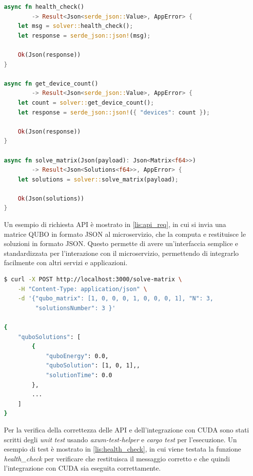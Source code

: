\vspace{5mm}
\begin{lstlisting}[language=Rust, caption=Web API, label=lis:api]
async fn health_check()
        -> Result<Json<serde_json::Value>, AppError> {
    let msg = solver::health_check();
    let response = serde_json::json!(msg);

    Ok(Json(response))
}

async fn get_device_count()
        -> Result<Json<serde_json::Value>, AppError> {
    let count = solver::get_device_count();
    let response = serde_json::json!({ "devices": count });

    Ok(Json(response))
}

async fn solve_matrix(Json(payload): Json<Matrix<f64>>)
        -> Result<Json<Solutions<f64>>, AppError> {
    let solutions = solver::solve_matrix(payload);

    Ok(Json(solutions))
}
\end{lstlisting}
\vspace{5mm}

Un esempio di richiesta \gls{API} è mostrato in \ref{lis:api_req}, in cui si invia una matrice \gls{QUBO} in formato \gls{JSON} al microservizio, che la computa e restituisce le soluzioni in formato \gls{JSON}. Questo permette di avere un'interfaccia semplice e standardizzata per l'interazione con il microservizio, permettendo di integrarlo facilmente con altri servizi e applicazioni.

\newpage
\vspace{5mm}
\begin{lstlisting}[language=bash, caption=Esempio richiesta API, label=lis:api_req]
$ curl -X POST http://localhost:3000/solve-matrix \
    -H "Content-Type: application/json" \
    -d '{"qubo_matrix": [1, 0, 0, 0, 1, 0, 0, 0, 1], "N": 3,
         "solutionsNumber": 3 }'

{
    "quboSolutions": [
        {
            "quboEnergy": 0.0,
            "quboSolution": [1, 0, 1],,
            "solutionTime": 0.0
        },
        ...
    ]
}
\end{lstlisting}
\vspace{5mm}

Per la verifica della correttezza delle API e dell'integrazione con \gls{CUDA} sono stati scritti degli \textit{unit test} usando \textit{axum-test-helper} e \textit{cargo test} per l'esecuzione. Un esempio di test è mostrato in \ref{lis:health_check}, in cui viene testata la funzione \textit{health\_check} per verificare che restituisca il messaggio corretto e che quindi l'integrazione con \gls{CUDA} sia eseguita correttamente.

